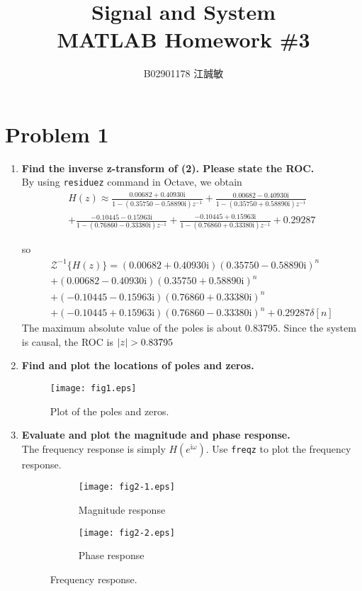 \documentclass[12pt, a4paper]{article}
\title{ \bf {\Huge Signal and System}\\ MATLAB Homework \#3}
\author{B02901178 江誠敏}
\DeclarePairedDelimiter{\abs}{\lvert}{\rvert}
\newcommand{\img}{\mathrm{i}}
\begin{document}
\maketitle

\section{Problem 1}
\begin{enumerate}[label=(\alph*)]
  \item {\bf Find the inverse z-transform of (2). Please state the ROC. } \\[12pt]
    By using \texttt{residuez} command in Octave, we obtain
    \begin{multline*}
      H(z) \approx \frac{ 0.00682 + 0.40930 \img }{ 1 - (0.35750 - 0.58890\img) z^{-1} }
      + \frac{ 0.00682 - 0.40930\img }{ 1 - (0.35750 + 0.58890\img) z^{-1} } \\
      + \frac{ -0.10445 - 0.15963\img }{ 1 - (0.76860 - 0.33380\img) z^{-1} }
      + \frac{ -0.10445 + 0.15963\img }{ 1 - (0.76860 + 0.33380\img) z^{-1} }
      + 0.29287
    \end{multline*}

    so
    \begin{multline*}
      \mathcal{Z}^{-1} \{ H(z) \} =  (0.00682 + 0.40930 \img) (0.35750 - 0.58890\img)^n  \\
      + (0.00682 - 0.40930 \img) (0.35750 + 0.58890\img)^n  \\
      + (-0.10445 - 0.15963 \img) (0.76860 + 0.33380\img)^n  \\
      + (-0.10445 + 0.15963 \img) (0.76860 - 0.33380\img)^n  + 0.29287 \delta[n]
      \end{multline*}
    The maximum absolute value of the poles is about $0.83795$.
    Since the system is causal,  the ROC is $ \abs{z} > 0.83795 $
    \clearpage
  \item {\bf Find and plot the locations of poles and zeros.} \\[12pt]

    \begin{figure}[H]
      \centering
      \texttt{[image: fig1.eps]}
      \caption{Plot of the poles and zeros.}
    \end{figure}


  \item {\bf Evaluate and plot the magnitude and phase response.} \\[12pt]
    The frequency response is simply $H(e^{\img \omega})$.
    Use \texttt{freqz} to plot the frequency response.
    \begin{figure}[H]
      \centering
      \begin{subfigure}{0.49\textwidth}
        \texttt{[image: fig2-1.eps]}
        \caption{Magnitude response}
      \end{subfigure} %
      \begin{subfigure}{0.49\textwidth}
        \texttt{[image: fig2-2.eps]}
        \caption{Phase response}
      \end{subfigure}
      \caption{Frequency response.}
    \end{figure}


\end{enumerate}
\end{document}
